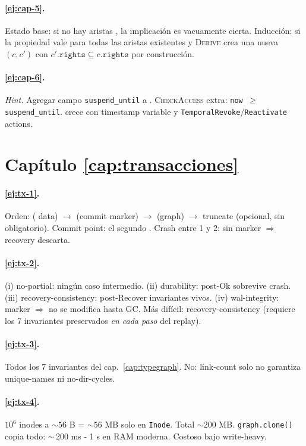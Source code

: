 \paragraph{\ref{ej:cap-5}.} Estado base: si no hay aristas \edelegates,
la implicación es vacuamente cierta. Inducción: si la propiedad vale
para todas las aristas existentes y \textsc{Derive} crea una nueva
$(c, c')$ con $c'.\texttt{rights} \subseteq c.\texttt{rights}$ por
construcción.

\paragraph{\ref{ej:cap-6}.} \emph{Hint.} Agregar campo \texttt{suspend\_until}
a \Cap. \textsc{CheckAccess} extra: \texttt{now $\geq$ suspend\_until}.
 crece con timestamp variable y
\texttt{TemporalRevoke}/\texttt{Reactivate} actions.

\section*{Capítulo \ref{cap:transacciones}}

\paragraph{\ref{ej:tx-1}.} Orden: \fsync(\wal{} data) $\to$
\fsync(commit marker) $\to$ \fsync(graph) $\to$ \wal{} truncate
(opcional, sin \fsync{} obligatorio). Commit point: el segundo
\fsync. Crash entre 1 y 2: \wal{} sin marker $\Rightarrow$ recovery
descarta.

\paragraph{\ref{ej:tx-2}.} (i) no-partial: ningún caso intermedio. (ii)
durability: post-Ok sobrevive crash. (iii) recovery-consistency: post-Recover
invariantes vivos. (iv) wal-integrity: marker $\Rightarrow$ no se
modifica hasta GC. Más difícil: recovery-consistency (requiere los 7
invariantes preservados \emph{en cada paso} del replay).

\paragraph{\ref{ej:tx-3}.} Todos los 7 invariantes del cap.~\ref{cap:typegraph}.
No: link-count solo no garantiza unique-names ni no-dir-cycles.

\paragraph{\ref{ej:tx-4}.} \(10^6\) inodes a $\sim 56$ B = $\sim 56$ MB
solo en \texttt{Inode}. Total $\sim 200$ MB. \texttt{graph.clone()}
copia todo: $\sim$\,200 ms - 1 s en RAM moderna. Costoso bajo
write-heavy.

